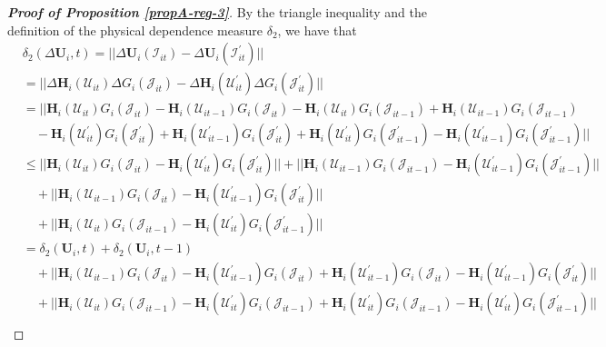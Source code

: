 \documentclass[a4paper,12pt]{article}
\begin{document}
\begin{proof}[\textnormal{\textbf{Proof of Proposition \ref{propA-reg-3}}}]
By the triangle inequality and the definition of the physical dependence measure $\delta_2$, we have that
\begin{align*}
 &\delta_2(\Delta \mathbf{U}_i, t) = || \Delta\mathbf{U}_i(\mathcal{I}_{it}) - \Delta \mathbf{U}_i(\mathcal{I}_{it}^\prime) || \\
 &= || \Delta \mathbf{H}_i(\mathcal{U}_{it}) \Delta G_i(\mathcal{J}_{it}) -  \Delta \mathbf{H}_i(\mathcal{U}_{it}^\prime) \Delta G_i(\mathcal{J}_{it}^\prime) ||\\
  &= ||\mathbf{H}_i(\mathcal{U}_{it})G_i(\mathcal{J}_{it}) - \mathbf{H}_i(\mathcal{U}_{it-1})G_i(\mathcal{J}_{it}) - \mathbf{H}_i(\mathcal{U}_{it})G_i(\mathcal{J}_{it-1})  + \mathbf{H}_i(\mathcal{U}_{it-1})G_i(\mathcal{J}_{it-1})  \\
 &\quad - \mathbf{H}_i(\mathcal{U}_{it}^\prime)G_i(\mathcal{J}_{it}^\prime) + \mathbf{H}_i(\mathcal{U}_{it-1}^\prime)G_i(\mathcal{J}_{it}^\prime) + \mathbf{H}_i(\mathcal{U}_{it}^\prime)G_i(\mathcal{J}_{it-1}^\prime)  - \mathbf{H}_i(\mathcal{U}_{it-1}^\prime)G_i(\mathcal{J}_{it-1}^\prime) || \\
 &\leq ||\mathbf{H}_i(\mathcal{U}_{it})G_i(\mathcal{J}_{it}) - \mathbf{H}_i(\mathcal{U}_{it}^\prime)G_i(\mathcal{J}_{it}^\prime) || + ||\mathbf{H}_i(\mathcal{U}_{it-1})G_i(\mathcal{J}_{it-1}) -  \mathbf{H}_i(\mathcal{U}_{it-1}^\prime)G_i(\mathcal{J}_{it-1}^\prime)||  \\
 &\quad + ||\mathbf{H}_i(\mathcal{U}_{it-1})G_i(\mathcal{J}_{it}) -\mathbf{H}_i(\mathcal{U}_{it-1}^\prime)G_i(\mathcal{J}_{it}^\prime)    || \\
 &\quad + ||\mathbf{H}_i(\mathcal{U}_{it})G_i(\mathcal{J}_{it-1}) -  \mathbf{H}_i(\mathcal{U}_{it}^\prime)G_i(\mathcal{J}_{it-1}^\prime) ||  \\
 & = \delta_2(\mathbf{U}_i, t) + \delta_2(\mathbf{U}_i, t-1)  \\
 &\quad + ||\mathbf{H}_i(\mathcal{U}_{it-1})G_i(\mathcal{J}_{it}) - \mathbf{H}_i(\mathcal{U}_{it-1}^\prime)G_i(\mathcal{J}_{it}) + \mathbf{H}_i(\mathcal{U}_{it-1}^\prime)G_i(\mathcal{J}_{it}) - \mathbf{H}_i(\mathcal{U}_{it-1}^\prime)G_i(\mathcal{J}_{it}^\prime)    ||\\
 &\quad + ||\mathbf{H}_i(\mathcal{U}_{it})G_i(\mathcal{J}_{it-1}) -\mathbf{H}_i(\mathcal{U}_{it}^\prime)G_i(\mathcal{J}_{it-1})+ \mathbf{H}_i(\mathcal{U}_{it}^\prime)G_i(\mathcal{J}_{it-1})-  \mathbf{H}_i(\mathcal{U}_{it}^\prime)G_i(\mathcal{J}_{it-1}^\prime) || \\

\end{align*}
\end{proof}
\end{document}
